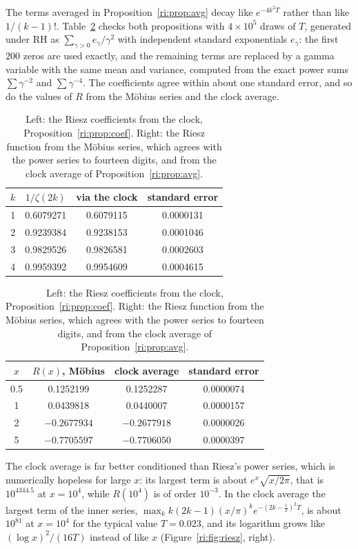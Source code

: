 The terms averaged in Proposition~\ref{ri:prop:avg} decay like $e^{-4k^2T}$ rather than like $1/(k-1)!$. Table~\ref{ri:tab:check} checks both propositions with $4\times10^5$ draws of $T$, generated under RH as $\sum_{\gamma>0}e_\gamma/\gamma^2$ with independent standard exponentials $e_\gamma$: the first $200$ zeros are used exactly, and the remaining terms are replaced by a gamma variable with the same mean and variance, computed from the exact power sums $\sum\gamma^{-2}$ and $\sum\gamma^{-4}$. The coefficients agree within about one standard error, and so do the values of $R$ from the M\"obius series and the clock average.

\begin{table}[htbp]
\centering\small
\begin{tabular}{cccc}
\toprule
$k$ & $1/\zeta(2k)$ & via the clock & standard error\\
\midrule
1 & 0.6079271 & 0.6079115 & 0.0000131\\
2 & 0.9239384 & 0.9238153 & 0.0001046\\
3 & 0.9829526 & 0.9826581 & 0.0002603\\
4 & 0.9959392 & 0.9954609 & 0.0004615\\
\bottomrule
\end{tabular}
\qquad
\begin{tabular}{cccc}
\toprule
$x$ & $R(x)$, M\"obius & clock average & standard error\\
\midrule
0.5 & 0.1252199 & 0.1252287 & 0.0000074\\
1 & 0.0439818 & 0.0440007 & 0.0000157\\
2 & $-0.2677934$ & $-0.2677918$ & 0.0000026\\
5 & $-0.7705597$ & $-0.7706050$ & 0.0000397\\
\bottomrule
\end{tabular}
\caption{Left: the Riesz coefficients from the clock, Proposition~\ref{ri:prop:coef}. Right: the Riesz function from the M\"obius series, which agrees with the power series to fourteen digits, and from the clock average of Proposition~\ref{ri:prop:avg}.}
\label{ri:tab:check}
\end{table}

The clock average is far better conditioned than Riesz's power series, which is numerically hopeless for large $x$: its largest term is about $e^x\sqrt{x/2\pi}$, that is $10^{4344.5}$ at $x=10^4$, while $R(10^4)$ is of order $10^{-3}$. In the clock average the largest term of the inner series, $\max_kk(2k-1)(x/\pi)^ke^{-(2k-\frac12)^2T}$, is about $10^{81}$ at $x=10^4$ for the typical value $T=0.023$, and its logarithm grows like $(\log x)^2/(16T)$ instead of like $x$ (Figure~\ref{ri:fig:riesz}, right).

